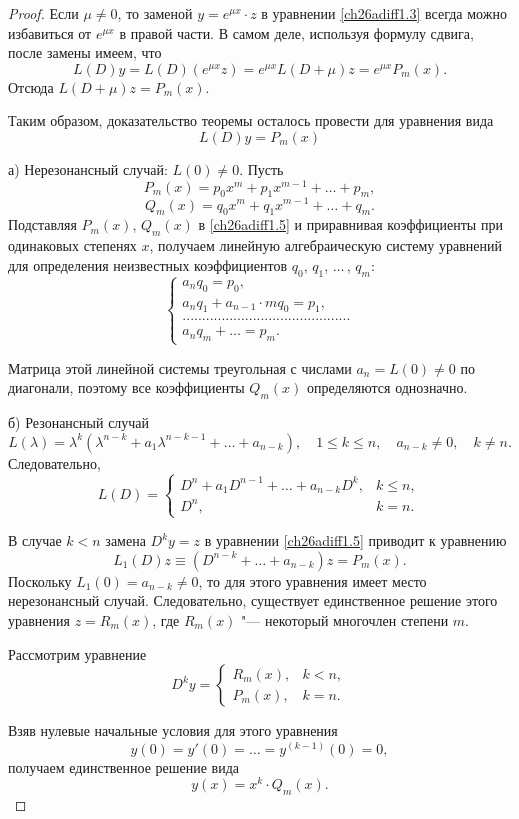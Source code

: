 \begin{proof}
Если $\mu\neq 0$, то заменой $y=e^{\mu x}\cdot z$ в уравнении \eqref{ch26adiff1.3} всегда можно избавиться от $e^{\mu x}$ в правой части. В самом деле,  используя формулу сдвига, после замены имеем, что
$$
L(D)y=L(D)(e^{\mu x}z)=e^{\mu x}L(D+\mu)z=e^{\mu x}P_m(x).
$$
Отсюда $L(D+\mu)z=P_m(x)$.

Таким образом, доказательство теоремы осталось провести для уравнения вида
\begin{equation}\label{ch26adiff1.5}
L(D)y=P_m(x)
\end{equation}

а) Нерезонансный случай: $L(0)\neq 0$. Пусть
$$
P_m(x)=p_0x^m+p_1x^{m-1}+\dots+p_m,
$$
$$
Q_m(x)=q_0x^m+q_1x^{m-1}+\dots+q_m.
$$
Подставляя $P_m(x)$, $Q_m(x)$ в \eqref{ch26adiff1.5} и приравнивая коэффициенты при одинаковых степенях $x$, получаем линейную алгебраическую систему уравнений для  определения неизвестных коэффициентов $q_0$, $q_1$, $\dots\,$, $q_m$:
$$
\begin{cases}
a_nq_0=p_0,\\
a_nq_1+a_{n-1}\cdot m q_0=p_1,\\
...........................................\\
a_nq_m+\dots=p_m.
\end{cases}
$$

Матрица этой линейной системы треугольная с числами $a_n=L(0)\neq 0$ по диагонали, поэтому все коэффициенты $Q_m(x)$ определяются однозначно.

б) Резонансный случай
$$
L(\lambda)=\lambda^k(\lambda^{n-k}+a_1\lambda^{n-k-1}+\dots+a_{n-k}),\quad 1\le k \le n,\quad a_{n-k}\neq 0,\quad k\neq n.
$$
Следовательно,
$$
L(D)=\begin{cases}
D^n+a_1D^{n-1}+\dots+a_{n-k}D^k, &k\le n,\\
D^n, &k=n.
\end{cases}
$$

В случае $k<n$ замена $D^ky=z$ в уравнении \eqref{ch26adiff1.5} приводит к уравнению
$$
L_1(D)z\equiv (D^{n-k}+\dots+a_{n-k})z=P_m(x).
$$
Поскольку $L_1(0)=a_{n-k}\neq 0$, то для этого уравнения имеет место нерезонансный случай. Следовательно, существует единственное решение этого уравнения $z=R_m(x)$, где $R_m(x)$ "--- некоторый многочлен степени $m$.


Рассмотрим уравнение
$$
D^ky=\begin{cases}
R_m(x), &k<n,\\
P_m(x), &k=n.
\end{cases}
$$

Взяв нулевые начальные условия для этого уравнения
$$
y(0)=y'(0)=\dots=y^{(k-1)}(0)=0,
$$
получаем единственное решение вида
\begin{equation}
y(x)=x^k\cdot Q_m(x).\tag*{\qedhere}
\end{equation}
\end{proof}
